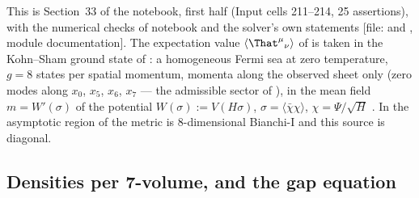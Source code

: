 This is Section~33 of the notebook, first half (Input cells 211--214, 25 assertions), with the
numerical checks of notebook  and the solver's own statements
[file:  and , module
documentation]. The expectation value $\langle\That^\mu{}_\nu\rangle$ of  is taken in the
Kohn--Sham ground state of : a homogeneous Fermi sea at zero temperature, $g=8$ states
per spatial momentum, momenta along the observed sheet only (zero modes along $x_0$, $x_5$, $x_6$, $x_7$
--- the admissible sector of ), in the mean field $m=W'(\sigma)$ of the potential
$W(\sigma):=V(H\sigma)$, $\sigma=\langle\bar\chi\chi\rangle$, $\chi=\Psi/\sqrt H$ . In
the asymptotic region of  the metric is 8-dimensional Bianchi-I and this source is
diagonal.

\subsection{Densities per 7-volume, and the gap equation}
\label{sec:7.1}

